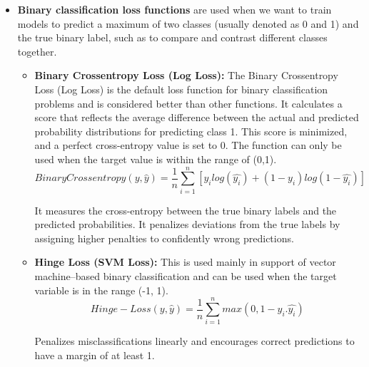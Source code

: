 \begin{itemize}
\begin{itemize}
    \end{itemize}
    \item \textbf{Binary classification loss functions} are used when we want to train models to predict a maximum of two classes (usually denoted as 0 and 1) and the true binary label, such as to compare and contrast different classes together. \\
          \begin{itemize}
          \item \textbf{Binary Crossentropy Loss (Log Loss): } The Binary Crossentropy Loss (Log Loss) is the default loss function for binary classification problems and is considered better than other functions. It calculates a score that reflects the average difference between the actual and predicted probability distributions for predicting class 1. This score is minimized, and a perfect cross-entropy value is set to 0. The function can only be used when the target value is within the range of (0,1).
          $$Binary Crossentropy(y, \hat{y})=\frac{1}{n}\sum_{i=1}^{n}[y_{i}log(\hat{y_{i}})+(1-y_{i})log(1-\hat{y_{i}})]$$

          It measures the cross-entropy between the true binary labels and the predicted probabilities. It penalizes deviations from the true labels by assigning higher penalties to confidently wrong predictions.
          \item \textbf{Hinge Loss (SVM Loss):} This is used mainly in support of vector machine–based binary classification and can be used when the target variable is in the range (-1, 1).
          $$Hinge-Loss(y,\hat{y})= \frac{1}{n}\sum_{i=1}^{n}max(0,1-y_{i}.\hat{y_{i}})$$

          Penalizes misclassifications linearly and encourages correct predictions to have a margin of at least 1.


\end{itemize}
\end{itemize}
